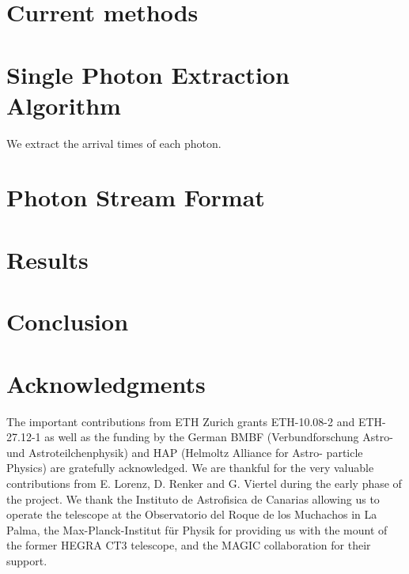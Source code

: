 \documentclass[review]{elsarticle}
\begin{document}
\section{Current methods}

%
\section{Single Photon Extraction Algorithm}
\label{SecExtractor}
%
We extract the arrival times of each photon. 
%
\section{Photon Stream Format}
\label{SecPhotonStream}
\section{Results}
%
\section{Conclusion}

%
\section*{Acknowledgments}
%
The important contributions from ETH Zurich grants ETH-10.08-2 and ETH-27.12-1 as well as the funding by the German BMBF (Verbundforschung Astro- und Astroteilchenphysik) and HAP (Helmoltz Alliance for Astro- particle Physics) are gratefully acknowledged. 
%
We are thankful for the very valuable contributions from E. Lorenz, D. Renker and G. Viertel during the early phase of the project. 
%
We thank the Instituto de Astrofisica de Canarias allowing us to operate the telescope at the Observatorio del Roque de los Muchachos in La Palma, the Max-Planck-Institut für Physik for providing us with the mount of the former HEGRA CT3 telescope, and the MAGIC collaboration for their support.
%
\end{document}
